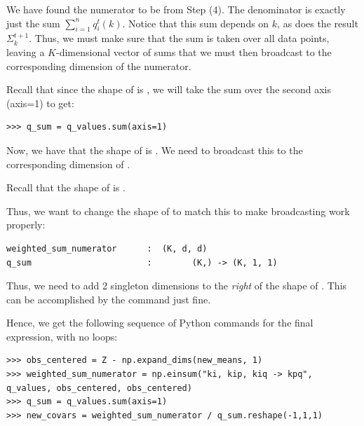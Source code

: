 \begin{itemize}
We have found the numerator to be  from Step (4). 
The denominator is exactly just the sum $\sum_{i=1}^{n} q_i^t(k)$.
Notice that this sum depends on $k$, as does the result $\Sigma_k^{t+1}$. 
Thus, we must make sure that the sum is taken over all data points, leaving a $K$-dimensional vector of sums that we must then broadcast to the corresponding dimension of the numerator.

Recall that since the shape of  is , we will take the sum over the second axis (axis=1) to get:
\begin{lstlisting}
>>> q_sum = q_values.sum(axis=1)
\end{lstlisting}

Now, we have that the shape of  is . 
We need to broadcast this to the corresponding dimension of .

Recall that the shape of  is .

Thus, we want to change the shape of  to match this to make broadcasting work properly:
\begin{lstlisting}
weighted_sum_numerator		:  (K, d, d) 
q_sum 						:        (K,) -> (K, 1, 1)
\end{lstlisting}
Thus, we need to add 2 singleton dimensions to the \emph{right} of the shape of .
This can be accomplished by the  command just fine.

Hence, we get the following sequence of Python commands for the final expression, with no loops:
\begin{lstlisting}
>>> obs_centered = Z - np.expand_dims(new_means, 1)
>>> weighted_sum_numerator = np.einsum("ki, kip, kiq -> kpq", q_values, obs_centered, obs_centered)
>>> q_sum = q_values.sum(axis=1)
>>> new_covars = weighted_sum_numerator / q_sum.reshape(-1,1,1)
\end{lstlisting}

	
\end{itemize}

